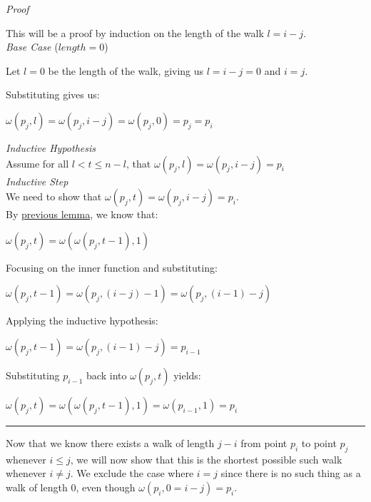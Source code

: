 \documentclass[a4paper,12pt]{article}
\begin{document}
\noindent
\textit{Proof}

\noindent This will be a proof by induction on the length of the walk $l = i - j$.\\

\noindent
\textit{Base Case} ($length = 0$)

\noindent Let $l = 0$ be the length of the walk, giving us $l = i - j = 0$ and $i = j$.

\noindent Substituting gives us:
\begin{center}
$\omega(p_j, l) = \omega(p_j, i - j) = \omega(p_j, 0) = p_j = p_i$
\end{center} 

\noindent
\textit{Inductive Hypothesis}\\
Assume for all $l < t \leq n - l$, that $\omega(p_j, l) = \omega(p_j, i - j) = p_i$\\

\noindent
\textit{Inductive Step}\\
We need to show that $\omega(p_j, t) = \omega(p_j, i - j) = p_i$.\\

\noindent By \hyperlink{lemma:composition_of_sub_walks}{previous lemma}, we know that:
\begin{center}
$\omega(p_j, t) = \omega(\omega(p_j, t - 1), 1)$
\end{center}

\noindent Focusing on the inner function and substituting:
\begin{center}
$\omega(p_j, t - 1) = \omega(p_j, (i - j) - 1) = \omega(p_j, (i - 1) - j)$
\end{center}

\noindent Applying the inductive hypothesis:
\begin{center}
$\omega(p_j, t - 1) = \omega(p_j, (i - 1) - j) = p_{i-1}$
\end{center}

\noindent Substituting $p_{i-1}$ back into $\omega(p_j, t)$ yields:
\begin{center}
$\omega(p_j, t) = \omega(\omega(p_j, t - 1), 1) = \omega(p_{i-1}, 1) = p_i$
\end{center}

\begin{center}
\noindent\rule{8cm}{0.4pt}
\end{center}


\noindent Now that we know there exists a walk of length $j - i$ from point $p_i$ to point $p_j$ whenever $i \leq j$, we will now show that this is the shortest possible such walk whenever $i \neq j$. We exclude the case where $i = j$ since there is no such thing as a walk of length $0$, even though $\omega(p_i, 0 = i - j) = p_i$.\\
\end{document}
